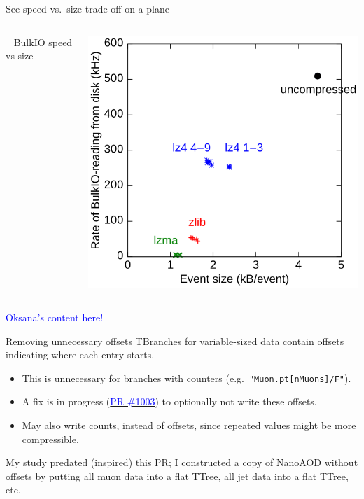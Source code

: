 \documentclass[aspectratio=169]{beamer}
\begin{document}
\begin{frame}{See speed vs.\ size trade-off on a plane}
\begin{columns}
\vspace{2 cm}

\mbox{ } \hfill BulkIO speed vs size \hfill \mbox{ }

\includegraphics[width=\linewidth]{bulk.png}
\end{columns}
\end{frame}

\begin{frame}{}
\begin{center}
\textcolor{blue}{\Huge Oksana's content here!}
\end{center}
\end{frame}

\begin{frame}{Removing unnecessary offsets}
\vspace{0.5 cm}
TBranches for variable-sized data contain offsets indicating where each entry starts.
\begin{itemize}
\item This is unnecessary for branches with counters (e.g.\ {\tt "Muon.pt[nMuons]/F"}).
\item A fix is in progress (\href{https://github.com/root-project/root/pull/1003}{\textcolor{blue}{PR \#1003}}) to optionally not write these offsets.
\item May also write counts, instead of offsets, since repeated values might be more compressible.
\end{itemize}

\vspace{0.5 cm}
\begin{center}
\begin{minipage}{0.7\linewidth}
My study predated (inspired) this PR; I constructed a copy of NanoAOD without offsets by putting all muon data into a flat TTree, all jet data into a flat TTree, etc.
\end{minipage}
\end{center}
\end{frame}
\end{document}
